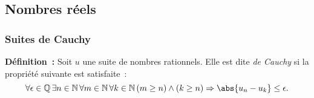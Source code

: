 %
%
%
%
%
%
%
%
%
%

\subsection{Nombres réels}

\subsubsection{Suites de Cauchy}
\label{subsub:Cauchy}

\noindent\textbf{Définition :} Soit $u$ une suite de nombres rationnels. 
    Elle est dite \textit{de Cauchy} si la propriété suivante est satisfaite : 
    \begin{equation*}
        \forall \epsilon \in \mathbb{Q} \, 
        \exists n \in \mathbb{N} \,
        \forall m \in \mathbb{N} \,
        \forall k \in \mathbb{N} \,
        (m \geq n) \wedge (k \geq n)
        \Rightarrow \abs{u_n - u_k} \leq \epsilon
        .
    \end{equation*}

\medskip

